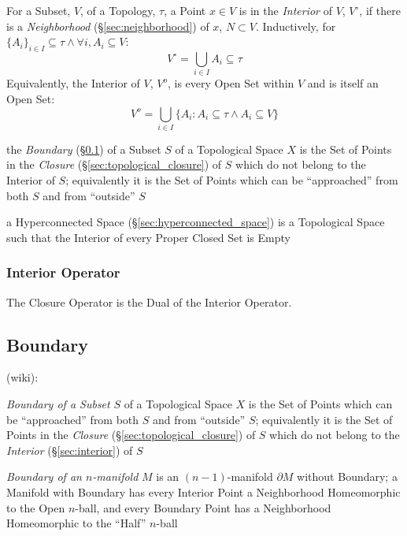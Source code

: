 For a Subset, $V$, of a Topology, $\tau$, a Point $x \in V$ is in the
\emph{Interior} of $V$, $V^{\circ}$, if there is a \emph{Neighborhood}
(\S\ref{sec:neighborhood}) of $x$, $N \subset V$. Inductively, for
$\{A_i\}_{i \in I} \subseteq \tau \wedge \forall i, A_i \subseteq V$:
\[
  V^{\circ} = \bigcup_{i \in I} A_i \subseteq \tau
\]
Equivalently, the Interior of $V$, $V^o$, is every Open Set within $V$
and is itself an Open Set:
\[
  V^o = \bigcup_{i \in I} \{ A_i : A_i \subseteq \tau \wedge A_i
  \subseteq V \}
\]

\fist the \emph{Boundary} (\S\ref{sec:boundary}) of a Subset $S$ of a
Topological Space $X$ is the Set of Points in the \emph{Closure}
(\S\ref{sec:topological_closure}) of $S$ which do not belong to the
Interior of $S$; equivalently it is the Set of Points which can be
``approached'' from both $S$ and from ``outside'' $S$

\fist a Hyperconnected Space (\S\ref{sec:hyperconnected_space}) is a
Topological Space such that the Interior of every Proper
Closed Set is Empty



\subsubsection{Interior Operator}\label{sec:interior_operator}

The Closure Operator is the Dual of the Interior Operator.



\subsection{Boundary}\label{sec:boundary}

(wiki):

\emph{Boundary of a Subset} $S$ of a Topological Space $X$ is the Set of Points
which can be ``approached'' from both $S$ and from ``outside'' $S$; equivalently
it is the Set of Points in the \emph{Closure} (\S\ref{sec:topological_closure})
of $S$ which do not belong to the \emph{Interior} (\S\ref{sec:interior}) of $S$

\emph{Boundary of an $n$-manifold} $M$ is an $(n-1)$-manifold $\partial M$
without Boundary; a Manifold with Boundary has every Interior Point a
Neighborhood Homeomorphic to the Open $n$-ball, and every Boundary Point has a
Neighborhood Homeomorphic to the ``Half'' $n$-ball

